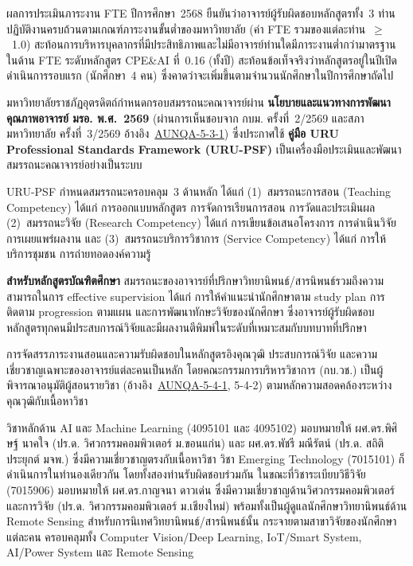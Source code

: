 ผลการประเมินภาระงาน FTE ปีการศึกษา~2568 ยืนยันว่าอาจารย์ผู้รับผิดชอบหลักสูตรทั้ง~3 ท่านปฏิบัติงานครบถ้วนตามเกณฑ์ภาระงานขั้นต่ำของมหาวิทยาลัย (ค่า FTE รวมของแต่ละท่าน~$\geq$~1.0) สะท้อนการบริหารบุคลากรที่มีประสิทธิภาพและไม่มีอาจารย์ท่านใดมีภาระงานต่ำกว่ามาตรฐาน ในด้าน FTE ระดับหลักสูตร CPE\&AI ที่~0.16 (ทั้งปี) สะท้อนข้อเท็จจริงว่าหลักสูตรอยู่ในปีเปิดดำเนินการรอบแรก (นักศึกษา~4 คน) ซึ่งคาดว่าจะเพิ่มขึ้นตามจำนวนนักศึกษาในปีการศึกษาถัดไป


มหาวิทยาลัยราชภัฏอุตรดิตถ์กำหนดกรอบสมรรถนะคณาจารย์ผ่าน \textbf{นโยบายและแนวทางการพัฒนาคุณภาพอาจารย์ มรอ. พ.ศ.~2569} (ผ่านการเห็นชอบจาก กบม. ครั้งที่~2/2569 และสภามหาวิทยาลัย ครั้งที่~3/2569 อ้างอิง~\hyperlink{ref:AUNQA-5-3-1}{AUNQA-5-3-1}) ซึ่งประกาศใช้ \textbf{คู่มือ URU Professional Standards Framework (URU-PSF)} เป็นเครื่องมือประเมินและพัฒนาสมรรถนะคณาจารย์อย่างเป็นระบบ

URU-PSF กำหนดสมรรถนะครอบคลุม~3 ด้านหลัก ได้แก่ (1)~สมรรถนะการสอน (Teaching Competency) ได้แก่ การออกแบบหลักสูตร การจัดการเรียนการสอน การวัดและประเมินผล (2)~สมรรถนะวิจัย (Research Competency) ได้แก่ การเขียนข้อเสนอโครงการ การดำเนินวิจัย การเผยแพร่ผลงาน และ (3)~สมรรถนะบริการวิชาการ (Service Competency) ได้แก่ การให้บริการชุมชน การถ่ายทอดองค์ความรู้

\textbf{สำหรับหลักสูตรบัณฑิตศึกษา} สมรรถนะของอาจารย์ที่ปรึกษาวิทยานิพนธ์/สารนิพนธ์รวมถึงความสามารถในการ effective supervision ได้แก่ การให้คำแนะนำนักศึกษาตาม study plan การติดตาม progression ตามแผน และการพัฒนาทักษะวิจัยของนักศึกษา ซึ่งอาจารย์ผู้รับผิดชอบหลักสูตรทุกคนมีประสบการณ์วิจัยและมีผลงานตีพิมพ์ในระดับที่เหมาะสมกับบทบาทที่ปรึกษา


การจัดสรรภาระงานสอนและความรับผิดชอบในหลักสูตรอิงคุณวุฒิ ประสบการณ์วิจัย และความเชี่ยวชาญเฉพาะของอาจารย์แต่ละคนเป็นหลัก โดยคณะกรรมการบริหารวิชาการ (กบ.วช.) เป็นผู้พิจารณาอนุมัติผู้สอนรายวิชา (อ้างอิง~\hyperlink{ref:AUNQA-5-4-1}{AUNQA-5-4-1}, 5-4-2) ตามหลักความสอดคล้องระหว่างคุณวุฒิกับเนื้อหาวิชา

วิชาหลักด้าน AI และ Machine Learning (4095101 และ 4095102) มอบหมายให้ ผศ.ดร.พิศิษฐ์ นาคใจ (ปร.ด. วิศวกรรมคอมพิวเตอร์ ม.ขอนแก่น) และ ผศ.ดร.พัชรี มณีรัตน์ (ปร.ด. สถิติประยุกต์ มจพ.) ซึ่งมีความเชี่ยวชาญตรงกับเนื้อหาวิชา วิชา Emerging Technology (7015101) ก็ดำเนินการในทำนองเดียวกัน โดยทั้งสองท่านรับผิดชอบร่วมกัน ในขณะที่วิชาระเบียบวิธีวิจัย (7015906) มอบหมายให้ ผศ.ดร.กาญจนา ดาวเด่น ซึ่งมีความเชี่ยวชาญด้านวิศวกรรมคอมพิวเตอร์และการวิจัย (ปร.ด. วิศวกรรมคอมพิวเตอร์ ม.เชียงใหม่) พร้อมทั้งเป็นผู้ดูแลนักศึกษาวิทยานิพนธ์ด้าน Remote Sensing สำหรับการนิเทศวิทยานิพนธ์/สารนิพนธ์นั้น กระจายตามสาขาวิจัยของนักศึกษาแต่ละคน ครอบคลุมทั้ง Computer Vision/Deep Learning, IoT/Smart System, AI/Power System และ Remote Sensing


